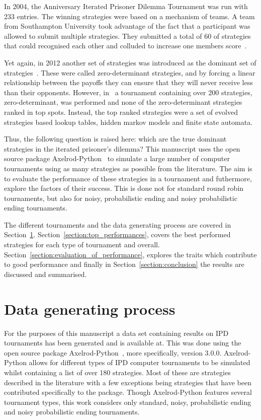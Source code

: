 \documentclass{article}
\begin{document}
In 2004, the Anniversary Iterated Prisoner Dilemma Tournament was run with 233
entries. The winning strategies were based on a mechanism of teams. A team from
Southampton University took advantage of the fact that a participant was allowed
to submit multiple strategies. They submitted a total of 60 of strategies that
could recognised each other and colluded to increase one members
score~\cite{J.P.Delahaye1993Lp, J.P.Delahaye1995LIeP, A.Rogers2007Ctpw}.

Yet again, in 2012 another set of strategies was introduced as the dominant set
of strategies~\cite{Press2012}. These were called zero-determinant strategies,
and by forcing a linear relationship between the payoffs they can ensure that
they will never receive less than their opponents. However, in~\cite{Harper2017}
a tournament containing over 200 strategies, zero-determinant, was performed and
none of the zero-determinant strategies ranked in top spots. Instead, the top
ranked strategies were a set of evolved strategies based lookup tables, hidden
markov models and finite state automata.

Thus, the following question is raised here: which are the true dominant
strategies in the iterated prisoner's dilemma?
This manuscript uses the open source package
Axelrod-Python~\cite{axelrodproject} to simulate a large number of computer
tournaments using as many strategies as possible from the literature. The aim is
to evaluate the performance of these strategies in a tournament and futhermore,
explore the factors of their success. This is done not for standard round robin
tournaments, but also for noisy, probabilistic ending and noisy probabilistic
ending tournaments.

The different tournaments and the data generating process are covered in
Section~\ref{section:data_collection}. Section~\ref{section:top_performances},
covers the best performed strategies for each type of tournament and overall.
Section~\ref{section:evaluation_of_performance}, explores the traits which
contribute to good performance and finally in Section~\ref{section:conclusion}
the results are discussed and summarised.

\section{Data generating process}\label{section:data_collection}

For the purposes of this manuscript a data set containing results on IPD tournaments
has been generated and is available at. This
was done using the open source package Axelrod-Python~\cite{axelrodproject},
more specifically, version 3.0.0. Axelrod-Python allows for different types of
IPD computer tournaments to be simulated whilst
containing a list of over 180 strategies. Most of these are strategies described
in the literature with a few exceptions being strategies that have been
contributed specifically to the package. Though Axelrod-Python features several
tournament types, this work considers only standard, noisy, probabilistic ending
and noisy probabilistic ending tournaments.
\end{document}
